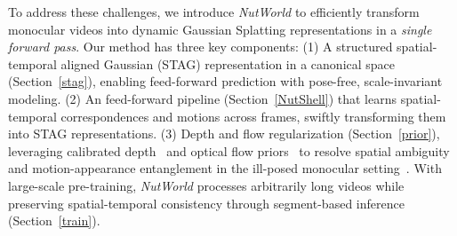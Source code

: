 To address these challenges, we introduce \textit{NutWorld} to efficiently transform monocular videos into dynamic Gaussian Splatting representations in a \textit{single forward pass}. Our method has three key components: (1) A structured spatial-temporal aligned Gaussian (STAG) representation in a canonical space (Section~\ref{stag}), enabling feed-forward prediction with pose-free, scale-invariant modeling. (2) An feed-forward pipeline (Section~\ref{NutShell}) that learns spatial-temporal correspondences and  motions across frames, swiftly transforming them into STAG representations. (3) Depth and flow regularization (Section~\ref{prior}), leveraging calibrated depth~\cite{chen2025video, yang2024depth} and optical flow priors~\cite{xu2023unifying} to resolve spatial ambiguity and motion-appearance entanglement in the ill-posed monocular setting~\cite{sun2024splatter, som2024}. With large-scale pre-training, \textit{NutWorld} processes arbitrarily long videos while preserving spatial-temporal consistency through segment-based inference (Section~\ref{train}).




%

% 



